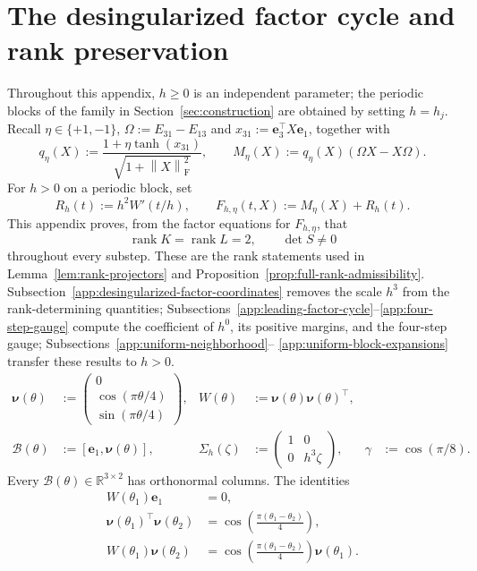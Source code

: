 \documentclass[]{article}
\numberwithin{equation}{section}
\theoremstyle{plain}
\theoremstyle{remark}
\newcommand{\F}{\mathrm F}
\newcommand{\norm}[1]{\left\lVert #1\right\rVert}
\newcommand{\rank}{\operatorname{rank}}
\begin{document}
\appendix
\section{The desingularized factor cycle and rank preservation}
\label{app:uniformity}

Throughout this appendix, $h\ge0$ is an independent parameter; the
periodic blocks of the family in Section~\ref{sec:construction} are
obtained by setting $h=h_j$.  Recall
$\eta\in\{+1,-1\}$,
$\Omega:=E_{31}-E_{13}$ and
$x_{31}:=\boldsymbol e_3^\top X\boldsymbol e_1$, together with
\[
 q_\eta(X):=\frac{1+\eta\tanh(x_{31})}
 {\sqrt{1+\norm{X}_{\F}^2}},
 \qquad M_\eta(X):=q_\eta(X)(\Omega X-X\Omega).
\]
For $h>0$ on a periodic block, set
\[
 R_h(t):=h^2W'(t/h),\qquad F_{h,\eta}(t,X):=M_\eta(X)+R_h(t).
\]
This appendix proves, from the factor equations for $F_{h,\eta}$, that
\[
 \rank K=\rank L=2,
 \qquad \det S\ne0
\]
throughout every substep.  These are the rank statements used in
Lemma~\ref{lem:rank-projectors} and
Proposition~\ref{prop:full-rank-admissibility}.  Subsection~\ref{app:desingularized-factor-coordinates}
removes the scale $h^3$ from the rank-determining quantities;
Subsections~\ref{app:leading-factor-cycle}--\ref{app:four-step-gauge}
compute the coefficient of $h^0$, its positive margins, and
the four-step gauge; Subsections~\ref{app:uniform-neighborhood}--
\ref{app:uniform-block-expansions} transfer these results to $h>0$.
\begin{equation}\label{eq:factor-definitions}
\begin{aligned}
 \boldsymbol\nu(\theta)&:=
 \begin{pmatrix}0\\ \cos(\pi\theta/4)\\ \sin(\pi\theta/4)\end{pmatrix},
 &W(\theta)&:=\boldsymbol\nu(\theta)\boldsymbol\nu(\theta)^\top,\\
 \mathcal B(\theta)&:=[\boldsymbol e_1,\boldsymbol\nu(\theta)],
 &\Sigma_h(\zeta)&:=\begin{pmatrix}1&0\\0&h^3\zeta\end{pmatrix},
 &\gamma&:=\cos(\pi/8).
\end{aligned}
\end{equation}
Every $\mathcal B(\theta)\in\mathbb R^{3\times2}$ has orthonormal columns.  The
identities
\begin{equation}\label{eq:nu-inner-product}
\begin{aligned}
 W(\theta_1)\boldsymbol e_1&=0,\\
 \boldsymbol\nu(\theta_1)^\top\boldsymbol\nu(\theta_2)
 &=\cos\!\left(\frac{\pi(\theta_1-\theta_2)}4\right),\\
 W(\theta_1)\boldsymbol\nu(\theta_2)
 &=\cos\!\left(\frac{\pi(\theta_1-\theta_2)}4\right)
 \boldsymbol\nu(\theta_1).
\end{aligned}
\end{equation}
\end{document}

